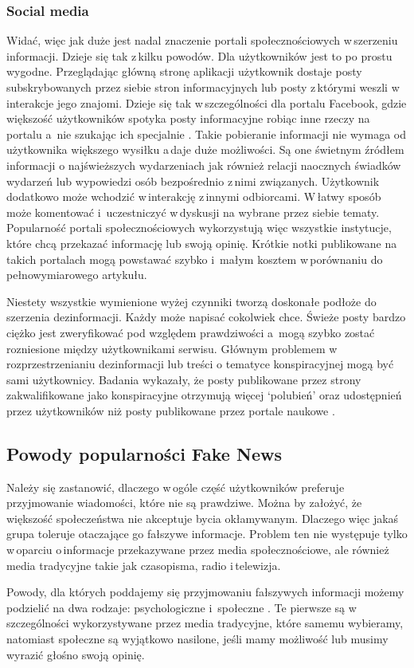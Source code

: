 \subsubsection{Social media}
Widać, więc jak duże jest nadal znaczenie portali społecznościowych w\,szerzeniu informacji. Dzieje się tak z\,kilku powodów. Dla użytkowników jest to po prostu wygodne. Przeglądając główną stronę aplikacji użytkownik dostaje posty subskrybowanych przez siebie stron informacyjnych lub posty z\,którymi weszli w\,interakcje jego znajomi. Dzieje się tak w\,szczególności dla portalu Facebook, gdzie większość użytkowników spotyka posty informacyjne robiąc inne rzeczy na portalu a \,nie szukając ich specjalnie \cite{PewNewsUse2016}. Takie pobieranie informacji nie wymaga od użytkownika większego wysiłku a\,daje duże możliwości. Są one świetnym źródłem informacji o najświeższych wydarzeniach jak również relacji naocznych świadków wydarzeń lub wypowiedzi osób bezpośrednio z\,nimi związanych. Użytkownik dodatkowo może wchodzić w\,interakcję z\,innymi odbiorcami. W\,łatwy sposób może komentować i \,uczestniczyć w\,dyskusji na wybrane przez siebie tematy. Popularność portali społecznościowych wykorzystują więc wszystkie instytucje, które chcą przekazać informację lub swoją opinię. Krótkie notki publikowane na takich portalach mogą powstawać szybko i \,małym kosztem w\,porównaniu do pełnowymiarowego artykułu. 
\par Niestety wszystkie wymienione wyżej czynniki tworzą doskonałe podłoże do szerzenia dezinformacji. Każdy może napisać cokolwiek chce. Świeże posty bardzo ciężko jest zweryfikować pod względem prawdziwości a \,mogą szybko zostać rozniesione między użytkownikami serwisu. Głównym problemem w\,rozprzestrzenianiu dezinformacji lub treści o tematyce konspiracyjnej mogą być sami użytkownicy. Badania wykazały, że posty publikowane przez strony zakwalifikowane jako konspiracyjne otrzymują więcej ‘polubień’ oraz udostępnień przez użytkowników niż posty publikowane przez portale naukowe \cite{bessi2015science}. 

\subsection{Powody popularności Fake News}
Należy się zastanowić, dlaczego w\,ogóle część użytkowników preferuje przyjmowanie wiadomości, które nie są prawdziwe. Można by założyć, że większość społeczeństwa nie akceptuje bycia okłamywanym. Dlaczego więc jakaś grupa toleruje otaczające go fałszywe informacje.  Problem ten nie występuje tylko w\,oparciu o\,informacje przekazywane przez media społecznościowe, ale również media tradycyjne takie jak czasopisma, radio i\,telewizja. 
\par Powody, dla których poddajemy się przyjmowaniu fałszywych informacji możemy podzielić na dwa rodzaje: psychologiczne i \,społeczne \cite{shu2017fake}. Te pierwsze są w\,szczególności wykorzystywane przez media tradycyjne, które samemu wybieramy, natomiast społeczne są wyjątkowo nasilone, jeśli mamy możliwość lub musimy wyrazić głośno swoją opinię.


